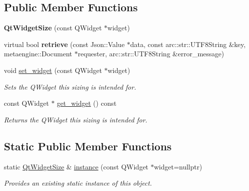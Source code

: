 \subsection*{Public Member Functions}
\begin{DoxyCompactItemize}
\item 
\hypertarget{classmeta__qt_1_1_qt_widget_size_acb39337e75029c5ec981a7d54de2c95f}{{\bfseries Qt\-Widget\-Size} (const Q\-Widget $\ast$widget)}\label{classmeta__qt_1_1_qt_widget_size_acb39337e75029c5ec981a7d54de2c95f}

\item 
\hypertarget{classmeta__qt_1_1_qt_widget_size_a9bb49ddebe4b4d357df66293b3b92715}{virtual bool {\bfseries retrieve} (const Json\-::\-Value $\ast$data, const arc\-::str\-::\-U\-T\-F8\-String \&key, metaengine\-::\-Document $\ast$requester, arc\-::str\-::\-U\-T\-F8\-String \&error\-\_\-message)}\label{classmeta__qt_1_1_qt_widget_size_a9bb49ddebe4b4d357df66293b3b92715}

\item 
\hypertarget{classmeta__qt_1_1_qt_widget_size_aff6a58cfb6f9261b8682f3990d7a370b}{void \hyperlink{classmeta__qt_1_1_qt_widget_size_aff6a58cfb6f9261b8682f3990d7a370b}{set\-\_\-widget} (const Q\-Widget $\ast$widget)}\label{classmeta__qt_1_1_qt_widget_size_aff6a58cfb6f9261b8682f3990d7a370b}

\begin{DoxyCompactList}\small\item\em Sets the Q\-Widget this sizing is intended for. \end{DoxyCompactList}\item 
\hypertarget{classmeta__qt_1_1_qt_widget_size_ae71a0381e2290bafd596298dfd378173}{const Q\-Widget $\ast$ \hyperlink{classmeta__qt_1_1_qt_widget_size_ae71a0381e2290bafd596298dfd378173}{get\-\_\-widget} () const }\label{classmeta__qt_1_1_qt_widget_size_ae71a0381e2290bafd596298dfd378173}

\begin{DoxyCompactList}\small\item\em Returns the Q\-Widget this sizing is intended for. \end{DoxyCompactList}\end{DoxyCompactItemize}
\subsection*{Static Public Member Functions}
\begin{DoxyCompactItemize}
\item 
static \hyperlink{classmeta__qt_1_1_qt_widget_size}{Qt\-Widget\-Size} \& \hyperlink{classmeta__qt_1_1_qt_widget_size_a5d4aa122035af70b51cd0f2dd29a82a9}{instance} (const Q\-Widget $\ast$widget=nullptr)
\begin{DoxyCompactList}\small\item\em Provides an existing static instance of this object. \end{DoxyCompactList}\end{DoxyCompactItemize}


